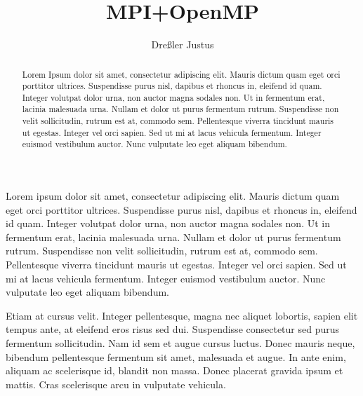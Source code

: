 \documentclass[sigconf]{acmart} %
\begin{document}
\title{MPI+OpenMP} %
\author{Dreßler Justus}



\begin{abstract}

    Lorem Ipsum dolor sit amet, consectetur adipiscing elit.
    Mauris dictum quam eget orci porttitor ultrices.
    Suspendisse purus nisl, dapibus et rhoncus in, eleifend id quam. Integer volutpat dolor urna, non auctor magna sodales non.
    Ut in fermentum erat, lacinia malesuada urna.
    Nullam et dolor ut purus fermentum rutrum.
    Suspendisse non velit sollicitudin, rutrum est at, commodo sem. Pellentesque viverra tincidunt mauris ut egestas.
    Integer vel orci sapien. Sed ut mi at lacus vehicula fermentum.
    Integer euismod vestibulum auctor.
    Nunc vulputate leo eget aliquam bibendum.

\end{abstract}

\maketitle


Lorem ipsum dolor sit amet, consectetur adipiscing elit. Mauris dictum quam eget orci porttitor ultrices. Suspendisse purus nisl, dapibus et rhoncus in, eleifend id quam. Integer volutpat dolor urna, non auctor magna sodales non. Ut in fermentum erat, lacinia malesuada urna. Nullam et dolor ut purus fermentum rutrum. Suspendisse non velit sollicitudin, rutrum est at, commodo sem. Pellentesque viverra tincidunt mauris ut egestas. Integer vel orci sapien. Sed ut mi at lacus vehicula fermentum. Integer euismod vestibulum auctor. Nunc vulputate leo eget aliquam bibendum.

Etiam at cursus velit. Integer pellentesque, magna nec aliquet lobortis, sapien elit tempus ante, at eleifend eros risus sed dui. Suspendisse consectetur sed purus fermentum sollicitudin. Nam id sem et augue cursus luctus. Donec mauris neque, bibendum pellentesque fermentum sit amet, malesuada et augue. In ante enim, aliquam ac scelerisque id, blandit non massa. Donec placerat gravida ipsum et mattis. Cras scelerisque arcu in vulputate vehicula.
\end{document}
